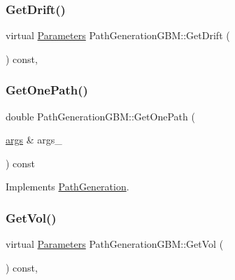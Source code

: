 \subsubsection{\texorpdfstring{Get\+Drift()}{GetDrift()}}
{\footnotesize\ttfamily virtual \hyperlink{classParameters}{Parameters} Path\+Generation\+G\+B\+M\+::\+Get\+Drift (\begin{DoxyParamCaption}{ }\end{DoxyParamCaption}) const\hspace{0.3cm}{\ttfamily [inline]}, {\ttfamily [virtual]}}

\hypertarget{classPathGenerationGBM_ac8bbe44a4ec2fd4a2249086d912dff33}{}\label{classPathGenerationGBM_ac8bbe44a4ec2fd4a2249086d912dff33} 
\subsubsection{\texorpdfstring{Get\+One\+Path()}{GetOnePath()}}
{\footnotesize\ttfamily double Path\+Generation\+G\+B\+M\+::\+Get\+One\+Path (\begin{DoxyParamCaption}\item[{\hyperlink{path__generation_8h_a75c13cde2074f502cc4348c70528572d}{args} \&}]{args\+\_\+ }\end{DoxyParamCaption}) const\hspace{0.3cm}{\ttfamily [virtual]}}



Implements \hyperlink{classPathGeneration_a9a64a37f4dd9b2b3ef84f3cb66aed843}{Path\+Generation}.

\hypertarget{classPathGenerationGBM_a9c4387dfc5f0d024f5d112996546c0c7}{}\label{classPathGenerationGBM_a9c4387dfc5f0d024f5d112996546c0c7} 
\subsubsection{\texorpdfstring{Get\+Vol()}{GetVol()}}
{\footnotesize\ttfamily virtual \hyperlink{classParameters}{Parameters} Path\+Generation\+G\+B\+M\+::\+Get\+Vol (\begin{DoxyParamCaption}{ }\end{DoxyParamCaption}) const\hspace{0.3cm}{\ttfamily [inline]}, {\ttfamily [virtual]}}

